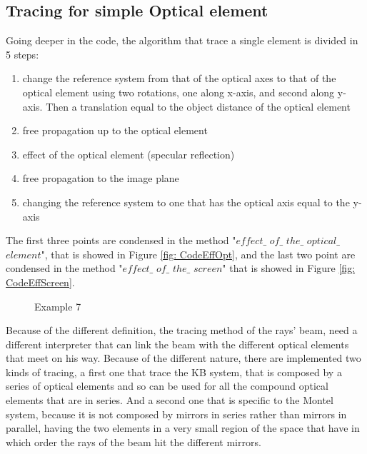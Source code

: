 \subsection{Tracing for simple Optical element}
Going deeper in the code, the algorithm that trace a single element is divided in 5 steps:
\begin{enumerate}
	\item change the reference system from that of the optical axes to that of the optical element using two rotations, one along x-axis, and second along y-axis. Then a translation equal to the object distance of the optical element
	\item free propagation up to the optical element
	\item effect of the optical element (specular reflection)
	\item free propagation to the image plane
	\item changing the reference system to one that has the optical axis equal to the y-axis
\end{enumerate}
The first three points are condensed in the method "$effect\_$ $of\_$ $the\_$ $optical\_$ $element $", that is showed in Figure \ref{fig: CodeEffOpt}, and the last two point are condensed in the method "$effect\_$ $of\_$ $the\_$ $screen$" that is showed in Figure \ref{fig: CodeEffScreen}.
\begin{figure}[H]
%
\centering
%
\quad
%
%
\caption{Example 7}
\label{fig :p1}
%
\end{figure}
Because of the different definition, the tracing method of the rays' beam, need a different interpreter that can link the beam with the different optical elements that meet on his way. Because of the different nature, there are implemented two kinds of tracing, a first one that trace the KB system, that is composed by a series of optical elements and so can be used for all the compound optical elements that are in series. And a second one that is specific to the Montel system, because it is not composed by mirrors in series rather than mirrors in parallel, having the two elements in a very small region of the space that have in which order the rays of the beam hit the different mirrors.
